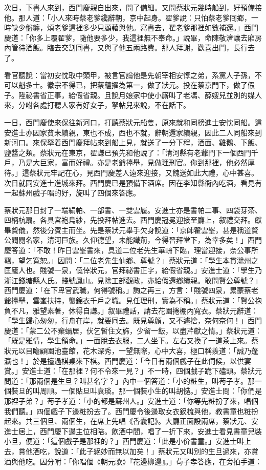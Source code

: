 次日，下書人來到，西門慶親自出來，問了備細。又問蔡狀元幾時船到，好預備接他。那人道：「小人來時蔡老爹纔辭朝，京中起身。翟爹說：只怕蔡老爹囘鄉，一時缺少盤纏，煩老爹這裡多少只顧藉與他。寫書去，翟老爹那裡如數補還。」西門慶道：「你多上覆翟爹，隨他要多少，我這裡無不奉命。」說畢，命陳敬濟讓去廂房內管待酒飯。臨去交割囘書，又與了他五兩路費。那人拜謝，歡喜出門，長行去了。

看官聽說：當初安忱取中頭甲，被言官論他是先朝宰相安惇之弟，系黨人子孫，不可以魁多士。徽宗不得已，把蔡蘊擢為第一，做了狀元。投在蔡京門下，做了假子。陞祕書省正事，給假省親。且說月娘家中使小厮叫了老馮、薛嫂兒並別的媒人來，分咐各處打聽人家有好女子，拏帖兒來說，不在話下。

一日，西門慶使來保往新河口，打聽蔡狀元船隻，原來就和同榜進士安忱同船。這安進士亦因家貧未續親，東也不成，西也不就，辭朝還家續親，因此二人同船來到新河口。來保拏着西門慶拜帖來到船上見，就送了一分下程，酒面、雞鵝、下飯、鹽醬之類。蔡狀元在東京，翟謙已預先和他說了：「清河縣有老爺門下一個西門千戶，乃是大巨家，富而好禮。亦是老爺擡舉，見做理刑官。你到那裡，他必然厚待。」這蔡狀元牢記在心，{}見西門慶差人遠來迎接，又餽送如此大禮，心中甚喜。次日就同安進士進城來拜。西門慶已是預備下酒席。因在李知縣衙內吃酒，看見有一起蘇州戲子唱的好，旋叫了四個來答應。

蔡狀元那日封了一端絹帕、一部書、一雙雲履。安進士亦是書帕二事、四袋芽茶、四柄杭扇。各具宮袍烏紗，先投拜帖進去。西門慶冠冕迎接至廳上，叙禮交拜。獻畢贄儀，然後分賓主而坐。先是蔡狀元舉手欠身說道：「京師翟雲峯，{}甚是稱道賢公閥閱名家，清河巨族。久仰德望，未能識荊，今得晉拜堂下，為幸多矣！」西門慶答道：「不敢！昨日雲峯書來，具道二位老先生華輈下臨，理當迎接，奈公事所羈，望乞寬恕。」因問：「二位老先生仙鄉、尊號？」蔡狀元道：「學生本貫滁州之匡廬人也。賤號一泉，僥倖狀元，官拜祕書正字，給假省親。」安進士道：「學生乃浙江錢塘縣人氏。賤號鳳山。見除工部觀政，亦給假還鄉續親。敢問賢公尊號？」西門慶道：「在下卑官武職，何得號稱。」詢之再三，方言：「賤號四泉，累蒙蔡老爺擡舉，雲峯扶持，襲錦衣千戶之職。見任理刑，實為不稱。」蔡狀元道：「賢公抱負不凡，雅望素著，休得自謙。」叙畢禮話，請去花園捲棚內寬衣。蔡狀元辭道：「學生歸心匆匆，行舟在岸，就要囘去。既見尊顏，又不遽捨，奈何奈何！」{}西門慶道：「蒙二公不棄蝸居，伏乞暫住文旆，少留一飯，以盡芹獻之情。」蔡狀元道：「既是雅情，學生領命。」一面脫去衣服，二人坐下。左右又換了一道茶上來。蔡狀元以目瞻顧園池臺館，花木深秀，一望無際，心中大喜，極口稱羨道：「誠乃蓬瀛也！」於是擡過棋桌來下棋。西門慶道：「今日有兩個戲子在此伺候，以供宴賞。」安進士道：「在那裡？何不令來一見？」不一時，四個戲子跪下磕頭。蔡狀元問道：「那兩個是生旦？叫甚名字？」內中一個答道：「小的粧生，叫苟子孝。那一個裝旦的叫周順。一個貼旦叫袁琰。那一個裝小生的叫胡慥。」安進士問：「你們是那裡子弟？」苟子孝道：「小的都是蘇州人。」安進士道：「你等先粧扮了來，唱個我們聽。」四個戲子下邊粧扮去了。西門慶令後邊取女衣釵梳與他，教書童也粧扮起來。共三個旦、兩個生，在席上先唱《香囊記》。大廳正面設兩席，蔡狀元、安進士居上，西門慶下邊主位相陪。飲酒中間，唱了一折下來，安進士看見書童兒裝小旦，便道：「這個戲子是那裡的？」西門慶道：「此是小价書童。」安進士叫上去，賞他酒吃，說道：「此子絕妙而無以加矣！」蔡狀元又叫別的生旦過來，亦賞酒與他吃。因分咐：「你唱個《朝元歌》『花邊柳邊』。」苟子孝答應，在旁拍手道：

